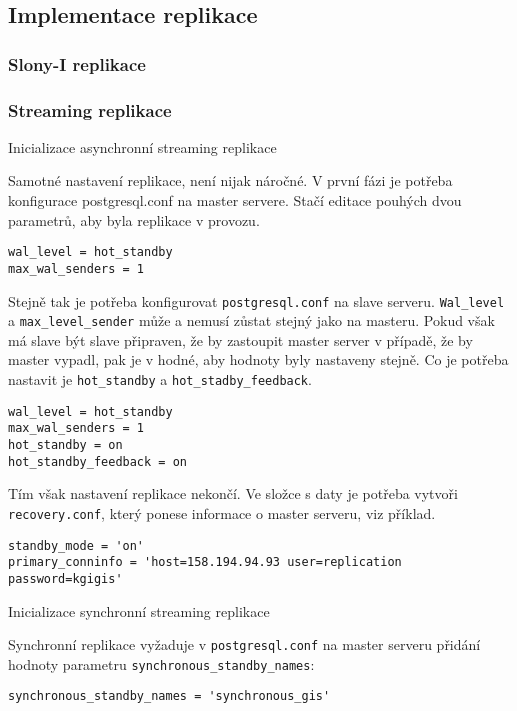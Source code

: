 \subsection{Implementace replikace}
\subsubsection{Slony-I replikace}
\subsubsection{Streaming replikace}
Inicializace asynchronní streaming replikace

Samotné nastavení replikace, není nijak náročné. V první fázi je potřeba konfigurace postgresql.conf na master servere. Stačí editace pouhých dvou parametrů, aby byla replikace v provozu. 

\begin{lstlisting}
wal_level = hot_standby
max_wal_senders = 1
\end{lstlisting}

Stejně tak je potřeba konfigurovat \texttt{postgresql.conf} na slave serveru. \texttt{Wal\_level} a \texttt{max\_level\_sender} může a nemusí zůstat stejný jako na masteru. Pokud však má slave být slave připraven, že by zastoupit master server v případě, že by master vypadl, pak je v hodné, aby hodnoty byly nastaveny stejně. Co je potřeba nastavit je \texttt{hot\_standby} a \texttt{hot\_stadby\_feedback}.

\begin{lstlisting}
wal_level = hot_standby
max_wal_senders = 1
hot_standby = on	
hot_standby_feedback = on
\end{lstlisting}

Tím však nastavení replikace nekončí. Ve složce s daty je potřeba vytvoři \texttt{recovery.conf}, který ponese informace o master serveru, viz příklad. 

\begin{lstlisting}
standby_mode = 'on'
primary_conninfo = 'host=158.194.94.93 user=replication password=kgigis'
\end{lstlisting}

Inicializace synchronní streaming replikace

Synchronní replikace vyžaduje v \texttt{postgresql.conf} na master serveru přidání hodnoty parametru \texttt{synchronous\_standby\_names}:

\begin{lstlisting}
synchronous_standby_names = 'synchronous_gis'
\end{lstlisting}

